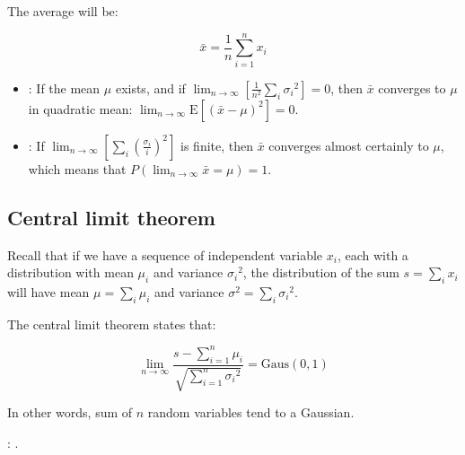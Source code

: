 The average will be:

\begin{equation}\label{eq:average}
	\bar{x} = \frac{1}{n} \sum_{i = 1}^{n}{x_{i}}
\end{equation}

\begin{itemize}[$\to$]
	\item {}: If the mean $\mu$ exists, and if $\lim_{n \to \infty} \left[ \frac{1}{n^{2}} \sum_{i} {\sigma_{i}}^{2} \right] = 0$, then $\bar{x}$ converges to $\mu$ in quadratic mean: $\lim_{n \to \infty} {\mathrm{E}\left[ (\bar{x} - \mu)^{2} \right]} = 0$.
	\item {}: If $\lim_{n \to \infty} \left[ \sum_{i} {\left( \frac{\sigma_{i}}{i} \right) }^{2} \right]$ is finite, then $\bar{x}$ converges almost certainly to $\mu$, which means that $P\left(\lim_{n \to \infty} {\bar{x}} = \mu \right) = 1$.
\end{itemize}


\subsection{Central limit theorem}
\label{subsec:central_limit_theorem}

Recall that if we have a sequence of independent variable $x_{i}$, each with  a distribution with mean $\mu_{i}$ and variance ${\sigma_{i}}^{2}$, the distribution of the sum $s = \sum_{i}{x_{i}}$ will have mean $\mu = \sum_{i}{\mu_{i}}$ and variance $\sigma^{2} = \sum_{i}{{\sigma_{i}}^{2}}$. 

The central limit theorem states that:

\begin{equation}\label{eq:central_limit_theorem}
	\lim_{n \to \infty} {\frac{s - \sum_{i = 1}^{n}{\mu_{i}}}{\sqrt{\sum_{i = 1}^{n}{{\sigma_{i}}^{2}}}} } = \mathrm{Gaus}(0, 1)
\end{equation}

In other words, sum of $n$ random variables tend to a Gaussian.


: .
